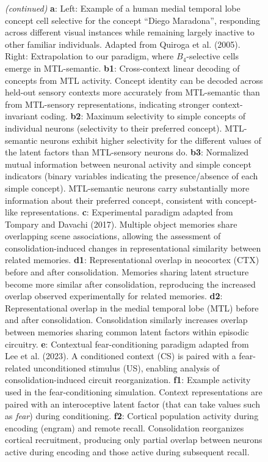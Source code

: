 \documentclass{article}
\begin{document}
\begin{figure}[h!]
  \ContinuedFloat
  \captionsetup{list=off} %
  \caption{\textit{(continued)} 
\textbf{a}: Left: Example of a human medial temporal lobe concept cell selective for the concept “Diego Maradona”, responding across different visual instances while remaining largely inactive to other familiar individuals. Adapted from Quiroga et al. (2005). Right: Extrapolation to our paradigm, where $B_4$-selective cells emerge in MTL-semantic.
\textbf{b1}: Cross-context linear decoding of concepts from MTL activity. Concept identity can be decoded across held-out sensory contexts more accurately from MTL-semantic than from MTL-sensory representations, indicating stronger context-invariant coding.
\textbf{b2}: Maximum selectivity to simple concepts of individual neurons (selectivity to their preferred concept). MTL-semantic neurons exhibit higher selectivity for the different values of the latent factors than MTL-sensory neurons do.
\textbf{b3}: Normalized mutual information between neuronal activity and simple concept indicators (binary variables indicating the presence/absence of each simple concept). MTL-semantic neurons carry substantially more information about their preferred concept, consistent with concept-like representations.
\textbf{c}: Experimental paradigm adapted from Tompary and Davachi (2017). Multiple object memories share overlapping scene associations, allowing the assessment of consolidation-induced changes in representational similarity between related memories.
\textbf{d1}: Representational overlap in neocortex (CTX) before and after consolidation. Memories sharing latent structure become more similar after consolidation, reproducing the increased overlap observed experimentally for related memories.
\textbf{d2}: Representational overlap in the medial temporal lobe (MTL) before and after consolidation. Consolidation similarly increases overlap between memories sharing common latent factors within episodic circuitry.
\textbf{e}: Contextual fear-conditioning paradigm adapted from Lee et al. (2023). A conditioned context (CS) is paired with a fear-related unconditioned stimulus (US), enabling analysis of consolidation-induced circuit reorganization.
\textbf{f1}: Example activity used in the fear-conditioning simulation. Context representations are paired with an interoceptive latent factor (that can take values such as \textit{fear}) during conditioning.
\textbf{f2}: Cortical population activity during encoding (engram) and remote recall. Consolidation reorganizes cortical recruitment, producing only partial overlap between neurons active during encoding and those active during subsequent recall.
}
\end{figure}
\end{document}
